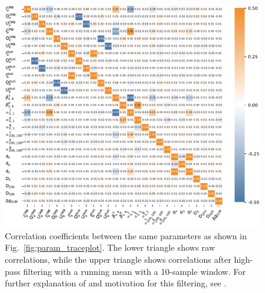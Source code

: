 \documentclass[twocolumn]{aa}
\begin{document}
\begin{figure}
  \center	
  \includegraphics[width=0.9\linewidth]{figs/CMB_covariance_summary_v3.pdf}
  \caption{Correlation coefficients between the same parameters as
    shown in Fig.~\ref{fig:param_traceplot}. The lower triangle shows
    raw correlations, while the upper triangle shows correlations
    after high-pass filtering with a running mean with a 10-sample
    window. For further explanation of and motivation for this
    filtering, see \citet{bp13}.  }
  \label{fig:param_corr_local}
\end{figure}
\end{document}
